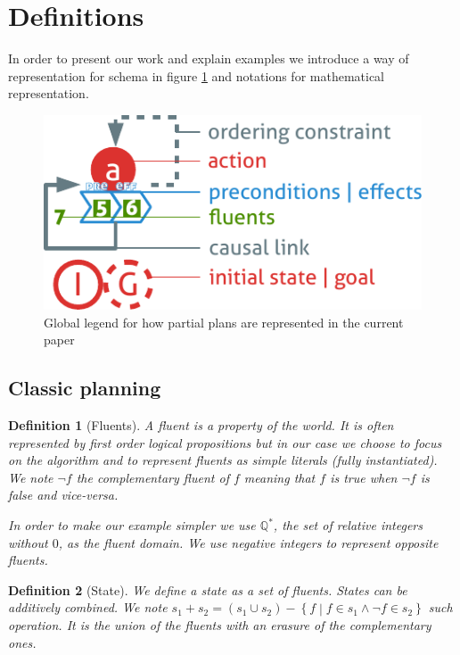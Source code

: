 \documentclass[]{article}
\newtheorem{definition}{Definition}
\begin{document}
\section{Definitions}\label{definitions}

In order to present our work and explain examples we introduce a way of
representation for schema in figure \ref{fig:legend} and notations for
mathematical representation.

\begin{figure}[htbp]
\centering
\includegraphics{graphics/legend.pdf}
\caption{Global legend for how partial plans are represented in the
current paper\label{fig:legend}}
\end{figure}

\subsection{Classic planning}\label{classic-planning}

\begin{definition}[Fluents]

A fluent is a property of the world. It is often represented by first
order logical propositions but in our case we choose to focus on the
algorithm and to represent fluents as simple literals (fully
instantiated). We note \(\lnot f\) the complementary fluent of \(f\)
meaning that \(f\) is true when \(\lnot f\) is false and vice-versa.

In order to make our example simpler we use \(\mathbb{Q}^*\), the set of
relative integers without \(0\), as the fluent domain. We use negative
integers to represent opposite fluents.

\end{definition}

\begin{definition}[State]

We define a state as a set of fluents. States can be additively
combined. We note
\(s_1 + s_2 = \left( s_1 \cup s_2 \right) - \left\{ f \middle| f \in s_1 \land \lnot f \in s_2 \right\}\)
such operation. It is the union of the fluents with an erasure of the
complementary ones.

\end{definition}
\end{document}
